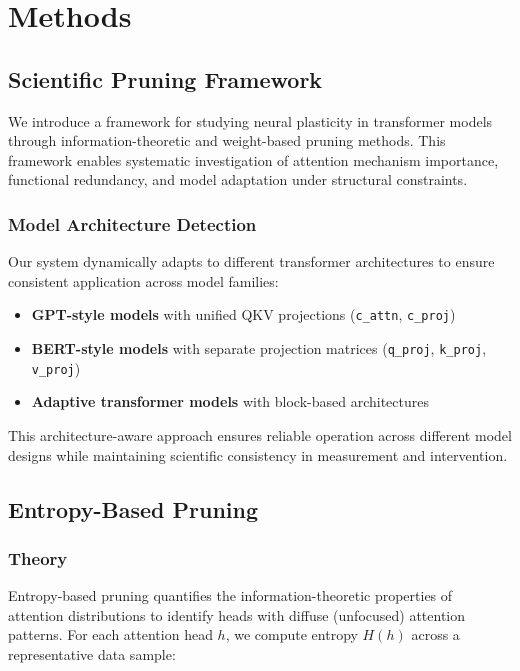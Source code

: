 \section{Methods}

\subsection{Scientific Pruning Framework}

We introduce a framework for studying neural plasticity in transformer models through information-theoretic and weight-based pruning methods. This framework enables systematic investigation of attention mechanism importance, functional redundancy, and model adaptation under structural constraints.

\subsubsection{Model Architecture Detection}

Our system dynamically adapts to different transformer architectures to ensure consistent application across model families:

\begin{itemize}
    \item \textbf{GPT-style models} with unified QKV projections (\texttt{c\_attn}, \texttt{c\_proj})
    \item \textbf{BERT-style models} with separate projection matrices (\texttt{q\_proj}, \texttt{k\_proj}, \texttt{v\_proj})
    \item \textbf{Adaptive transformer models} with block-based architectures
\end{itemize}

This architecture-aware approach ensures reliable operation across different model designs while maintaining scientific consistency in measurement and intervention.

\subsection{Entropy-Based Pruning}

\subsubsection{Theory}

Entropy-based pruning quantifies the information-theoretic properties of attention distributions to identify heads with diffuse (unfocused) attention patterns. For each attention head $h$, we compute entropy $H(h)$ across a representative data sample:

